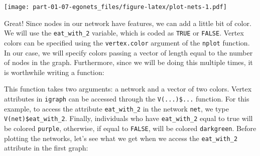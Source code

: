 \documentclass[
]{book}
\newenvironment{Shaded}{\begin{snugshade}}{\end{snugshade}}
\newcommand{\CommentTok}[1]{\textcolor[rgb]{0.56,0.35,0.01}{\textit{#1}}}
\newcommand{\ControlFlowTok}[1]{\textcolor[rgb]{0.13,0.29,0.53}{\textbf{#1}}}
\newcommand{\DecValTok}[1]{\textcolor[rgb]{0.00,0.00,0.81}{#1}}
\newcommand{\DocumentationTok}[1]{\textcolor[rgb]{0.56,0.35,0.01}{\textbf{\textit{#1}}}}
\newcommand{\FunctionTok}[1]{\textcolor[rgb]{0.13,0.29,0.53}{\textbf{#1}}}
\newcommand{\NormalTok}[1]{#1}
\newcommand{\OtherTok}[1]{\textcolor[rgb]{0.56,0.35,0.01}{#1}}
\newcommand{\SpecialCharTok}[1]{\textcolor[rgb]{0.81,0.36,0.00}{\textbf{#1}}}
\newcommand{\StringTok}[1]{\textcolor[rgb]{0.31,0.60,0.02}{#1}}
\begin{document}
\texttt{[image: part-01-07-egonets\_files/figure-latex/plot-nets-1.pdf]}

Great! Since nodes in our network have features, we can add a little bit of color. We will use the \texttt{eat\_with\_2} variable, which is coded as \texttt{TRUE} or \texttt{FALSE}. Vertex colors can be specified using the \texttt{vertex.color} argument of the \texttt{nplot} function. In our case, we will specify colors passing a vector of length equal to the number of nodes in the graph. Furthermore, since we will be doing this multiple times, it is worthwhile writing a function:

\begin{Shaded}
\end{Shaded}

This function takes two arguments: a network and a vector of two colors. Vertex attributes in \texttt{igraph} can be accessed through the \texttt{V(...)\$...} function. For this example, to access the attribute \texttt{eat\_with\_2} in the network \texttt{net}, we type \texttt{V(net)\$eat\_with\_2}. Finally, individuals who have \texttt{eat\_with\_2} equal to true will be colored \texttt{purple}, otherwise, if equal to \texttt{FALSE}, will be colored \texttt{darkgreen}. Before plotting the networks, let's see what we get when we access the \texttt{eat\_with\_2} attribute in the first graph:

\begin{Shaded}
\end{Shaded}
\end{document}
